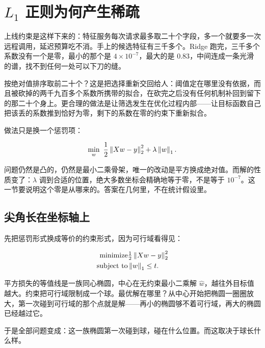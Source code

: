 \section{\texorpdfstring{\(L_1\) 正则为何产生稀疏}{L1 正则为何产生稀疏}}
\label{sec:09-Convex-Optimization/07-Applications/02}

上线约束是这样下来的：特征服务每次请求最多取二十个字段，多一个就要多一次远程调用，延迟预算吃不消。手上的候选特征有三千多个。Ridge 跑完，三千多个系数没有一个是零，最小的那个是 \(4\times10^{-7}\)，最大的是 \(0.83\)，中间连成一条光滑的谱，找不到任何一处可以下刀的缝。

按绝对值排序取前二十个？这是把选择重新交回给人：阈值定在哪里没有依据，而且被砍掉的两千九百多个系数所携带的拟合，在砍完之后没有任何机制补回到留下的那二十个身上。更合理的做法是让筛选发生在优化过程内部——让目标函数自己把该丢的系数推到恰好为零，剩下的系数在零的约束下重新拟合。

做法只是换一个惩罚项：

\[
\min_{w}\ \frac12\norm{Xw-y}_2^2+\lambda\norm{w}_1 .
\]

问题仍然是凸的，仍然是最小二乘骨架，唯一的改动是平方换成绝对值。而解的性质变了：\(\lambda\) 调到合适的位置，绝大多数坐标会精确地等于零，不是等于 \(10^{-7}\)。这一节要说明这个零是从哪来的。答案在几何里，不在统计假设里。

\subsection{尖角长在坐标轴上}

先把惩罚形式换成等价的约束形式，因为可行域看得见：

\[
\begin{aligned}
\text{minimize}\space & \tfrac12\left\lVert Xw-y\right\rVert_2^2\\
\text{subject to}\space & \left\lVert w\right\rVert_1\le t .
\end{aligned}
\]

平方损失的等值线是一族同心椭圆，中心在无约束最小二乘解 \(\hat w\)，越往外目标值越大。约束把可行域限制成一个球。最优解在哪里？从中心开始把椭圆一圈圈放大，第一次碰到可行域的那个点就是解——再小的椭圆够不着可行域，再大的椭圆已经越过它。

于是全部问题变成：这一族椭圆第一次碰到球，碰在什么位置。而这取决于球长什么样。

